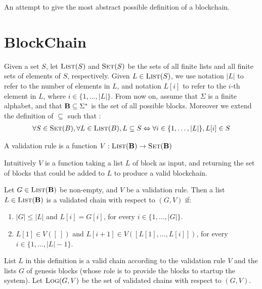 
An attempt to give the most abstract possible definition of a blockchain.

\section{BlockChain}
Given a set $S$, let $\text{\sc List}(S)$ and $\text{\sc Set}(S)$ be the sets of all finite lists and all finite sets of elements of $S$, respectively. Given $L \in \text{\sc List}(S)$, we use notation $|L|$ to refer to the number of elements in $L$, and notation $L[i]$ to refer to the $i$-th element in $L$, where $i \in \{1, \ldots, |L|\}$. From now on, assume that $\Sigma$ is a finite alphabet, and that $\text{\bf B} \subseteq \Sigma^*$ is the set of all possible blocks.  Moreover we extend the definition of $\subseteq$ such that :
\begin{eqnarray*}
	\forall S \in \text{\sc Set}(B), \forall L \in \text{\sc List}(B), L \subseteq S \Leftrightarrow \forall i \in \{1, \ldots, |L|\}, L[i] \in S
\end{eqnarray*}

\begin{mydef}
A validation rule is a function $V : \text{\sc List}(\text{\bf B}) \to \text{\sc Set}(\text{\bf B})$
\end{mydef}
Intuitively $V$ is a function taking a list $L$ of block as input, and returning the set of blocks that could be added to $L$ to produce a valid blockchain.

\begin{mydef}
Let $G \in \text{\sc List}(\text{\bf B})$ be non-empty, and $V$ be a validation rule. Then a list $L \in \text{\sc List}(\text{\bf B})$ is a validated chain with respect to $(G,V)$ if:
\begin{enumerate}
\item $|G| \leq |L|$ and $L[i] = G[i]$, for every $i \in \{1, \ldots, |G|\}$.

\item $L[1] \in V([\ ])$ and $L[i+1] \in V([L[1], \ldots, L[i]])$, for every $i \in \{1, \ldots, |L|-1\}$.
\end{enumerate}
\end{mydef}
List $L$ in this definition is a valid chain according to the validation rule $V$ and the lists $G$ of genesis blocks (whose role is to provide the blocks to startup the system). Let $\text{\sc Log}(G,V)$ be the set of validated chains with respect to $(G,V)$.

%
%

